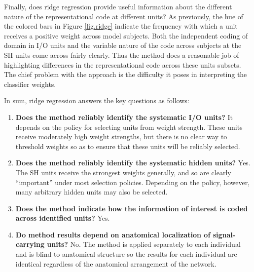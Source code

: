 Finally, does ridge regression provide useful information about the different nature of the representational code at different units? As previously, the hue of the colored bars in Figure \ref{fig.ridge} indicate the frequency with which a unit receives a positive weight across model subjects. Both the independent coding of domain in I/O units and the variable nature of the code across subjects at the SH units come across fairly clearly. Thus the method does a reasonable job of highlighting differences in the representational code across these units subsets. The chief problem with the approach is the difficulty it poses in interpreting the classifier weights.

In sum, ridge regression answers the key questions as follows:

\begin{enumerate}
\item {\bf Does the method reliably identify the systematic I/O units?} It depends on the policy for selecting units from weight strength. These units receive moderately high weight strengths, but there is no clear way to threshold weights so as to ensure that these units will be reliably selected.
\item {\bf Does the method reliably identify the systematic hidden units?} Yes. The SH units receive the strongest weights generally, and so are clearly ``important'' under most selection policies. Depending on the policy, however, many arbitrary hidden units may also be selected.
\item {\bf Does the method indicate how the information of interest is coded across identified units?} Yes.
\item {\bf Do method results depend on anatomical localization of signal-carrying units?} No. The method is applied separately to each individual and is blind to anatomical structure so the results for each individual are identical regardless of the anatomical arrangement of the network.
\end{enumerate}


